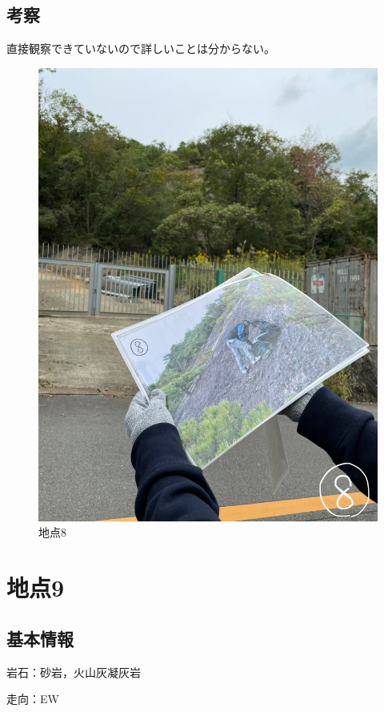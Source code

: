 \documentclass[uplatex,b5paper]{jsreport}
\begin{document}
    \subsection{考察}
    直接観察できていないので詳しいことは分からない。
    \begin{figure}[h]
      \begin{center}
        \includegraphics[scale=0.1]{files/地学実習/地点8.jpg}
        \caption{地点8}
      \end{center}    
    \end{figure}
  \clearpage

  \section{地点9}
    \subsection{基本情報}
    岩石：砂岩，火山灰凝灰岩\par
    走向：EW
\end{document}
